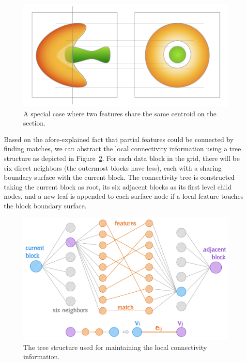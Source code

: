 \documentclass[10pt, conference, compsocconf]{IEEEtran}
\begin{document}
\begin{figure}[ht]
	\centering
	\includegraphics[width=0.9\linewidth]{figure1@2x.png}
	\caption{A special case where two features share the same centroid on the section.}
	\label{fig:special}
\end{figure}

Based on the afore-explained fact that partial features could be connected by finding matches, we can abstract the local connectivity information using a tree structure as depicted in Figure~\ref{fig:match}. For each data block in the grid, there will be six direct neighbors (the outermost blocks have less), each with a sharing boundary surface with the current block. The connectivity tree is constructed taking the current block as root, its six adjacent blocks as its first level child nodes, and a new leaf is appended to each surface node if a local feature touches the block boundary surface. 

\begin{figure}[ht]
	\centering
	\includegraphics[width=0.9\linewidth]{match.png}
	\caption{The tree structure used for maintaining the local connectivity information. }
	\label{fig:match}
\end{figure}
\end{document}
